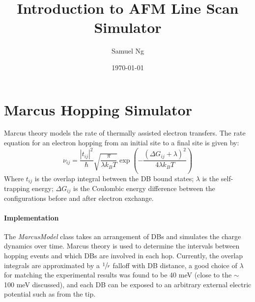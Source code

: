 \documentclass{article}
\title{Introduction to AFM Line Scan Simulator}
\date{\today}
\author{Samuel Ng}
\begin{document}
\makeatletter
\begin{center}
  \Large
  \textbf{\@title}
  \par
  \@author
\end{center}
\makeatother


\section{Marcus Hopping Simulator} \label{sec:introduction}




Marcus theory models the rate of thermally assisted electron transfers. The rate equation for an electron hopping from an initial site to a final site is given by:
%
\begin{equation}
  \nu_{ij} = \frac{|t_{ij}|^{2}}{\hbar} \sqrt{\frac{\pi}{\lambda k_{B} T}} \exp \left(- \frac{(\Delta G_{ij} + \lambda)^{2}}{4 \lambda k_{B} T} \right)
  \label{eq:marcus-tunneling-rate}
\end{equation}
%
Where $t_{ij}$ is the overlap integral between the DB bound states; $\lambda$ is the self-trapping energy; $\Delta G_{ij}$ is the Coulombic energy difference between the configurations before and after electron exchange.




\paragraph{Implementation}

The \textit{MarcusModel} class takes an arrangement of DBs and simulates the charge dynamics over time. Marcus theory is used to determine the intervals between hopping events and which DBs are involved in each hop. Currently, the overlap integrals are approximated by a $\sfrac{1}{r}$ falloff with DB distance, a good choice of $\lambda$ for matching the experimental results was found to be 40 meV (close to the $\sim$ 100 meV discussed), and each DB can be exposed to an arbitrary external electric potential such as from the tip. 
\end{document}
